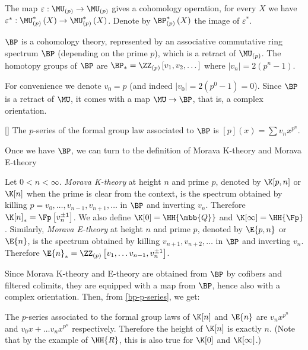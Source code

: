 The map $\varepsilon: \MU_{\left(p\right)} \to \MU_{\left(p\right)}$ gives a cohomology operation, for every $X$ we have $\varepsilon^*: \MU_{\left(p\right)}^*\left(X\right) \to \MU_{\left(p\right)}^*\left(X\right)$.
Denote by $\BP_{\left(p\right)}^*\left(X\right)$ the image of $\varepsilon^*$.

\begin{theorem}
	$\BP$ is a cohomology theory, represented by an associative commutative ring spectrum $\BP$ (depending on the prime $p$), which is a retract of $\MU_{\left(p\right)}$.
	The homotopy groups of $\BP$ are $\BP_* = \ZZ_{\left(p\right)}\left[v_1, v_2, \dotsc\right]$ where $\left|v_n\right| = 2\left(p^n-1\right)$.
\end{theorem}

For convenience we denote $v_0 = p$ (and indeed $\left|v_0\right| = 2\left(p^0-1\right) = 0$).
Since $\BP$ is a retract of $\MU$, it comes with a map $\MU \to \BP$, that is, a complex orientation.

\begin{proposition}\label{bp-p-series}[]
	The $p$-series of the formal group law associated to $\BP$ is
	$\left[p\right]\left(x\right) = \sum v_n x^{p^n}$.
\end{proposition}

Once we have $\BP$, we can turn to the definition of Morava K-theory and Morava E-theory

\begin{definition}
	Let $0 < n < \infty$.
	\emph{Morava K-theory} at height $n$ and prime $p$, denoted by $\K[p,n]$ or $\K[n]$ when the prime is clear from the context, is the spectrum obtained by killing $p=v_0, \dotsc, v_{n-1}, v_{n+1}, \dotsc$ in $\BP$ and inverting $v_n$.
	Therefore $\K[n]_* = \Fp\left[v_n^{\pm 1}\right]$.
	We also define $\K[0] = \HH{\mbb{Q}}$ and $\K[\infty] = \HH{\Fp}$.
	Similarly, \emph{Morava E-theory} at height $n$ and prime $p$, denoted by $\E{p,n}$ or $\E{n}$, is the spectrum obtained by killing $v_{n+1}, v_{n+2}, \dotsc$ in $\BP$ and inverting $v_n$.
	Therefore $\E{n}_* = \ZZ_{\left(p\right)}\left[v_1, \dotsc v_{n-1}, v_n^{\pm 1}\right]$.
\end{definition}

Since Morava K-theory and E-theory are obtained from $\BP$ by cofibers and filtered colimits, they are equipped with a map from $\BP$, hence also with a complex orientation.
Then, from \ref{bp-p-series}, we get:

\begin{corollary}\label{k-e-p-series}
	The $p$-series associated to the formal group laws of $\K[n]$ and $\E{n}$ are $v_n x^{p^n}$ and $v_0 x + \dotsc v_n x^{p^n}$ respectively.
	Therefore the height of $\K[n]$ is exactly $n$.
	(Note that by the example of $\HH{R}$, this is also true for $\K[0]$ and $\K[\infty]$.)
\end{corollary}

